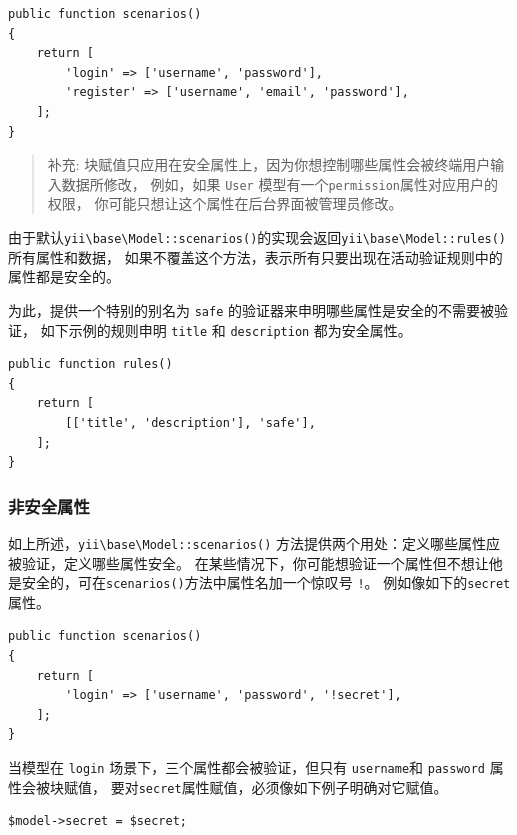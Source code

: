 \lstset{language=php}\begin{lstlisting}
public function scenarios()
{
    return [
        'login' => ['username', 'password'],
        'register' => ['username', 'email', 'password'],
    ];
}
\end{lstlisting}
\begin{quote}补充: 块赋值只应用在安全属性上，因为你想控制哪些属性会被终端用户输入数据所修改，
  例如，如果 \lstinline|User| 模型有一个\lstinline|permission|属性对应用户的权限，
  你可能只想让这个属性在后台界面被管理员修改。

\end{quote}
由于默认\texttt{yii{\allowbreak{}\textbackslash}base{\allowbreak{}\textbackslash}Model\allowbreak{}::\allowbreak{}scenarios()}的实现会返回\texttt{yii{\allowbreak{}\textbackslash}base{\allowbreak{}\textbackslash}Model\allowbreak{}::\allowbreak{}rules()}所有属性和数据，
如果不覆盖这个方法，表示所有只要出现在活动验证规则中的属性都是安全的。

为此，提供一个特别的别名为 \lstinline|safe| 的验证器来申明哪些属性是安全的不需要被验证，
如下示例的规则申明 \lstinline|title| 和 \lstinline|description| 都为安全属性。

\lstset{language=php}\begin{lstlisting}
public function rules()
{
    return [
        [['title', 'description'], 'safe'],
    ];
}
\end{lstlisting}
\subsubsection{非安全属性 \label{structure-models.md::unsafe-attributes}}
如上所述，\texttt{yii{\allowbreak{}\textbackslash}base{\allowbreak{}\textbackslash}Model\allowbreak{}::\allowbreak{}scenarios()} 方法提供两个用处：定义哪些属性应被验证，定义哪些属性安全。
在某些情况下，你可能想验证一个属性但不想让他是安全的，可在\lstinline|scenarios()|方法中属性名加一个惊叹号 \lstinline|!|。
例如像如下的\lstinline|secret|属性。

\lstset{language=php}\begin{lstlisting}
public function scenarios()
{
    return [
        'login' => ['username', 'password', '!secret'],
    ];
}
\end{lstlisting}
当模型在 \lstinline|login| 场景下，三个属性都会被验证，但只有 \lstinline|username|和 \lstinline|password| 属性会被块赋值，
要对\lstinline|secret|属性赋值，必须像如下例子明确对它赋值。

\lstset{language=php}\begin{lstlisting}
$model->secret = $secret;
\end{lstlisting}
